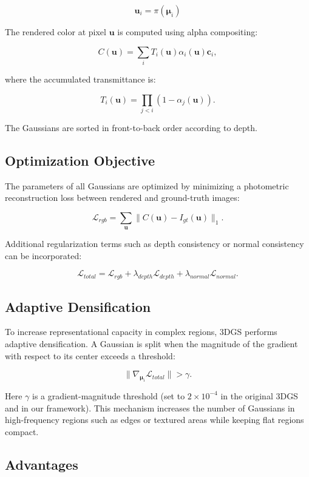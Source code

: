 \[
\mathbf{u}_i = \pi(\boldsymbol{\mu}_i)
\]

The rendered color at pixel $\mathbf{u}$ is computed using alpha compositing:

\[
C(\mathbf{u}) = \sum_{i} T_i(\mathbf{u}) \alpha_i(\mathbf{u}) \mathbf{c}_i,
\]

where the accumulated transmittance is:

\[
T_i(\mathbf{u}) = \prod_{j < i} \left(1 - \alpha_j(\mathbf{u}) \right).
\]

The Gaussians are sorted in front-to-back order according to depth.

\subsection{Optimization Objective}

The parameters of all Gaussians are optimized by minimizing a photometric reconstruction loss between rendered and ground-truth images:

\[
\mathcal{L}_{rgb}
=
\sum_{\mathbf{u}}
\| C(\mathbf{u}) - I_{gt}(\mathbf{u}) \|_1.
\]

Additional regularization terms such as depth consistency or normal consistency can be incorporated:

\[
\mathcal{L}_{total}
=
\mathcal{L}_{rgb}
+
\lambda_{depth} \mathcal{L}_{depth}
+
\lambda_{normal} \mathcal{L}_{normal}.
\]

\subsection{Adaptive Densification}

To increase representational capacity in complex regions, 3DGS performs adaptive densification. A Gaussian is split when the magnitude of the gradient with respect to its center exceeds a threshold:

\[
\| \nabla_{\boldsymbol{\mu}_i} \mathcal{L}_{total} \| > \gamma.
\]

Here $\gamma$ is a gradient-magnitude threshold (set to $2\times10^{-4}$ in the original 3DGS and in our framework). This mechanism increases the number of Gaussians in high-frequency regions such as edges or textured areas while keeping flat regions compact.

\subsection{Advantages}

